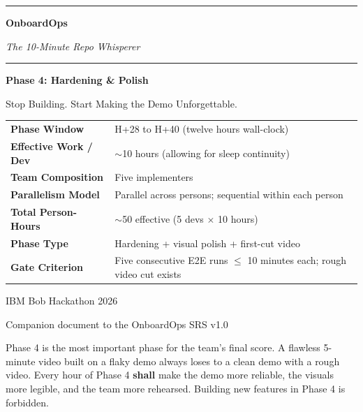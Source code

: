 \documentclass[11pt,letterpaper]{article}
\newcommand{\shall}{\textbf{shall}}
\begin{document}

\begin{titlepage}
\thispagestyle{empty}
\centering
\vspace*{1.5cm}

{\color{ibmblue}\rule{\textwidth}{2pt}}
\vspace{0.8cm}

{\fontsize{38}{46}\selectfont\bfseries\color{ibmblue} OnboardOps\par}
\vspace{0.3cm}
{\Large\itshape\color{ibmgray} The 10-Minute Repo Whisperer\par}
\vspace{0.4cm}

{\color{ibmblue}\rule{\textwidth}{2pt}}
\vspace{2.0cm}

{\huge\bfseries Phase 4: Hardening \& Polish\par}
\vspace{0.3cm}
{\large Stop Building. Start Making the Demo Unforgettable.\par}
\vspace{2.5cm}

\begin{tabularx}{0.78\textwidth}{lX}
\toprule
\textbf{Phase Window} & H+28 to H+40 (twelve hours wall-clock) \\
\textbf{Effective Work / Dev} & ${\sim}$10 hours (allowing for sleep continuity) \\
\textbf{Team Composition} & Five implementers \\
\textbf{Parallelism Model} & Parallel across persons; sequential within each person \\
\textbf{Total Person-Hours} & ${\sim}$50 effective (5 devs $\times$ 10 hours) \\
\textbf{Phase Type} & Hardening + visual polish + first-cut video \\
\textbf{Gate Criterion} & Five consecutive E2E runs $\leq$ 10 minutes each; rough video cut exists \\
\bottomrule
\end{tabularx}

\vfill

{\large IBM Bob Hackathon 2026\par}
{\normalsize Companion document to the OnboardOps SRS v1.0\par}
\vspace{0.6cm}
{\small\color{ibmgray} Phase 4 is the most important phase for the team's final score. A flawless 5-minute video built on a flaky demo always loses to a clean demo with a rough video. Every hour of Phase 4 \shall{} make the demo more reliable, the visuals more legible, and the team more rehearsed. Building new features in Phase 4 is forbidden.\par}
\end{titlepage}
\end{document}
